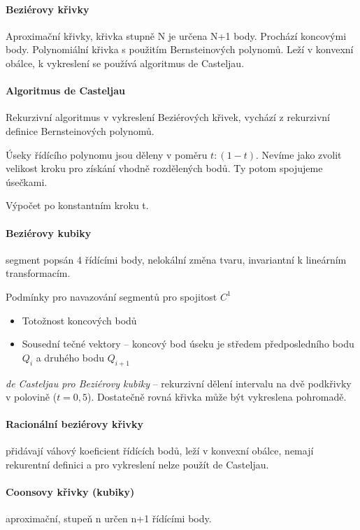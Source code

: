 \documentclass[a4paper, 11pt]{report}
\begin{document}
\paragraph{Beziérovy křivky}
Aproximační křivky, křivka stupně N je určena N+1 body. Prochází koncovými body. Polynomiální křivka s použitím Bernsteinových polynomů. Leží v konvexní obálce, k vykreslení se používá algoritmus de Casteljau.

\paragraph{Algoritmus de Casteljau} Rekurzivní algoritmus v vykreslení Beziérových křivek, vychází z rekurzivní definice Bernsteinových polynomů.

Úseky řídícího polynomu jsou děleny v poměru $t : (1-t)$. Nevíme jako zvolit velikost kroku pro získání vhodně rozdělených bodů. Ty potom spojujeme úsečkami.

Výpočet po konstantním kroku t.

\paragraph{Beziérovy kubiky}

segment popsán 4 řídícími body, nelokální změna tvaru, invariantní k lineárním transformacím.

Podmínky pro navazování segmentů pro spojitost $C^1$
\begin{itemize}
	\item Totožnost koncových bodů
	\item Sousední tečné vektory -- koncový bod úseku je středem předposledního bodu $Q_i$ a druhého bodu $Q_{i+1}$
\end{itemize}

\emph{de Casteljau pro Beziérovy kubiky} -- rekurzivní dělení intervalu na dvě podkřivky v polovině ($t = 0,5$). Dostatečně rovná křivka může být vykreslena pohromadě.

\paragraph{Racionální beziérovy křivky} přidávají váhový koeficient řídících bodů, leží v konvexní obálce, nemají rekurentní definici a pro vykreslení nelze použít de Casteljau.

\paragraph{Coonsovy křivky (kubiky)} aproximační, stupeň n určen n+1 řídícími body.
\end{document}
